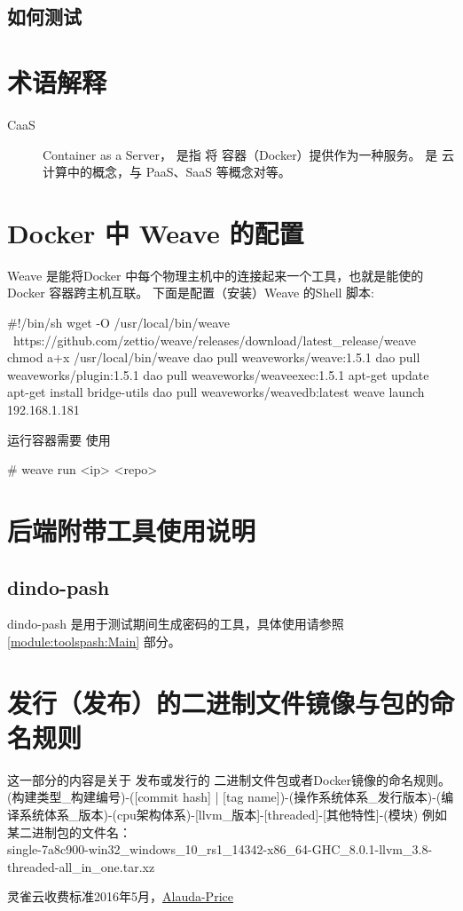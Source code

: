 \documentclass{dingo}
\begin{document}
		\subsection{如何测试}

  \newpage
  \begin{appendix}
  	\section{术语解释}
  	\label{section:term}
		\begin{description}
			\item[CaaS] Container as a Server， 是指 将 容器（Docker）提供作为一种服务。
				是 云计算中的概念，与 PaaS、SaaS 等概念对等。
		\end{description}

  	\section{Docker 中 Weave  的配置} %
  	\label{section:dockerNweave}
  	Weave 是能将Docker 中每个物理主机中的连接起来一个工具，也就是能使的 Docker 容器跨主机互联。
  	下面是配置（安装）Weave 的Shell 脚本:
  	\begin{bash}[caption=Weave 安装]
#!/bin/sh
wget -O /usr/local/bin/weave \
https://github.com/zettio/weave/releases/download/latest_release/weave
chmod a+x /usr/local/bin/weave
dao pull weaveworks/weave:1.5.1
dao pull weaveworks/plugin:1.5.1
dao pull weaveworks/weaveexec:1.5.1
apt-get update
apt-get install bridge-utils
dao pull weaveworks/weavedb:latest
weave launch 192.168.1.181
  	\end{bash}
  	运行容器需要 使用
  	\begin{shell}
# weave run <ip> <repo>
  	\end{shell}

		\section{后端附带工具使用说明}
			\subsection{dindo-pash}
			dindo-pash 是用于测试期间生成密码的工具，具体使用请参照 \ref{module:toolspash:Main} 部分。
    \section{发行（发布）的二进制文件镜像与包的命名规则}
    这一部分的内容是关于 发布或发行的 二进制文件包或者Docker镜像的命名规则。
    (构建类型\_构建编号)-([commit hash] | [tag name])-(操作系统体系\_发行版本)-(编译系统体系\_版本)-(cpu架构体系)-[llvm\_版本]-[threaded]-[其他特性]-(模块)
    例如某二进制包的文件名：\\
    single-7a8c900-win32\_windows\_10\_rs1\_14342-x86\_64-GHC\_8.0.1-llvm\_3.8-threaded-all\_in\_one.tar.xz

	  \begin{thebibliography}{}
		 	 灵雀云收费标准2016年5月，\href{http://www.alauda.cn/price/}{Alauda-Price}
		\end{thebibliography}
  \end{appendix}
\end{document}
